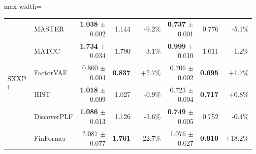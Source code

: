 \begin{table}[tb]
\begin{adjustbox}{max width=\textwidth}
{\begin{tabular}{llrrrrrr}
\midrule
\multirow{6}{*}{SXXP$^\dagger$} & MASTER & \textbf{1.038} {\scriptsize$\pm$0.002} & 1.144 & -9.2\% & \textbf{0.737} {\scriptsize$\pm$0.001} & 0.776 & -5.1\% \\
 & MATCC & \textbf{1.734} {\scriptsize$\pm$0.034} & 1.790 & -3.1\% & \textbf{0.999} {\scriptsize$\pm$0.010} & 1.011 & -1.2\% \\
 & FactorVAE & 0.860 {\scriptsize$\pm$0.004} & \textbf{0.837} & +2.7\% & 0.706 {\scriptsize$\pm$0.002} & \textbf{0.695} & +1.7\% \\
 & HIST & \textbf{1.018} {\scriptsize$\pm$0.009} & 1.027 & -0.9\% & 0.723 {\scriptsize$\pm$0.004} & \textbf{0.717} & +0.8\% \\
 & DiscoverPLF & \textbf{1.086} {\scriptsize$\pm$0.013} & 1.126 & -3.6\% & \textbf{0.749} {\scriptsize$\pm$0.005} & 0.752 & -0.4\% \\
 & FinFormer & 2.087 {\scriptsize$\pm$0.077} & \textbf{1.701} & +22.7\% & 1.076 {\scriptsize$\pm$0.027} & \textbf{0.910} & +18.2\% \\
\bottomrule
\end{tabular}
}
\end{adjustbox}
\label{tab:finbench_regression_horizons}
\end{table}

